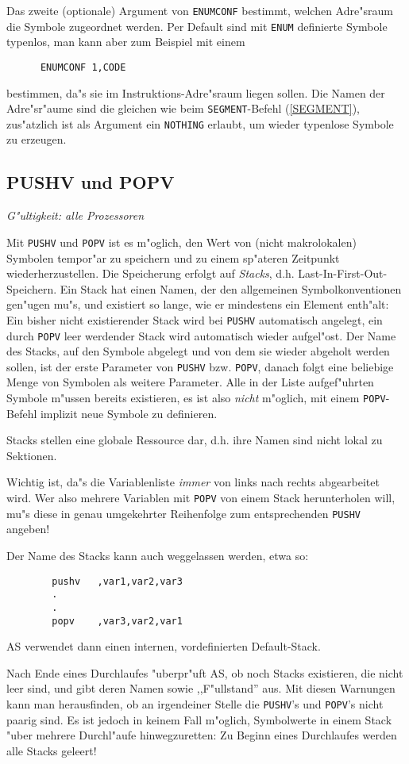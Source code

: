 \documentclass[12pt,a4paper,twoside]{report}
\makeatletter
\newcommand{\tty}[1]{{\tt #1}}
\newcommand{\ttindex}[1]{\index{#1@{\tt #1}}}
\makeatother
\begin{document}
Das zweite (optionale) Argument von \tty{ENUMCONF} bestimmt,
welchen Adre"sraum die Symbole zugeordnet werden.  Per Default
sind mit \tty{ENUM} definierte Symbole typenlos, man kann aber
zum Beispiel mit einem
\begin{verbatim}
      ENUMCONF 1,CODE
\end{verbatim}  
bestimmen, da"s sie im Instruktions-Adre"sraum liegen sollen.  Die
Namen der Adre"sr"aume sind die gleichen wie beim
\tty{SEGMENT}-Befehl (\ref{SEGMENT}), zus"atzlich ist als
Argument ein \tty{NOTHING} erlaubt, um wieder typenlose Symbole
zu erzeugen.


\subsection{PUSHV und POPV}
\ttindex{PUSHV}\ttindex{POPV}

{\em G"ultigkeit: alle Prozessoren}

Mit \tty{PUSHV} und \tty{POPV} ist es m"oglich, den Wert von (nicht
makrolokalen) Symbolen tempor"ar zu speichern und zu einem sp"ateren
Zeitpunkt wiederherzustellen.  Die Speicherung erfolgt auf {\em Stacks},
d.h. Last-In-First-Out-Speichern.  Ein Stack hat einen Namen, der den
allgemeinen Symbolkonventionen gen"ugen mu"s, und existiert so lange,
wie er mindestens ein Element enth"alt: Ein bisher nicht existierender
Stack wird bei \tty{PUSHV} automatisch angelegt, ein durch \tty{POPV} leer
werdender Stack wird automatisch wieder aufgel"ost.  Der Name des Stacks,
auf den Symbole abgelegt und von dem sie wieder abgeholt werden sollen,
ist der erste Parameter von \tty{PUSHV} bzw. \tty{POPV}, danach folgt
eine beliebige Menge von Symbolen als weitere Parameter.  Alle in der
Liste aufgef"uhrten Symbole m"ussen bereits existieren, es ist also
{\em nicht} m"oglich, mit einem \tty{POPV}-Befehl implizit neue Symbole
zu definieren.
\par
Stacks stellen eine globale Ressource dar, d.h. ihre Namen sind
nicht lokal zu Sektionen.
\par
Wichtig ist, da"s die Variablenliste {\em immer} von links nach rechts
abgearbeitet wird.  Wer also mehrere Variablen mit \tty{POPV} von einem
Stack herunterholen will, mu"s diese in genau umgekehrter Reihenfolge
zum entsprechenden \tty{PUSHV} angeben!
\par
Der Name des Stacks kann auch weggelassen werden, etwa so:
\begin{verbatim}
        pushv   ,var1,var2,var3
        .
        .
        popv    ,var3,var2,var1
\end{verbatim}
AS verwendet dann einen internen, vordefinierten Default-Stack.
\par
Nach Ende eines Durchlaufes "uberpr"uft AS, ob noch Stacks existieren,
die nicht leer sind, und gibt deren Namen sowie ,,F"ullstand'' aus.  Mit
diesen Warnungen kann man herausfinden, ob an irgendeiner Stelle die
\tty{PUSHV}'s und \tty{POPV}'s nicht paarig sind.  Es ist jedoch in
keinem Fall m"oglich, Symbolwerte in einem Stack "uber mehrere Durchl"aufe
hinwegzuretten: Zu Beginn eines Durchlaufes werden alle Stacks geleert!
\end{document}
